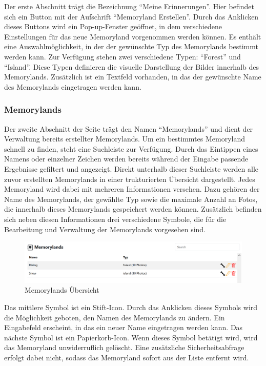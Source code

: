 Der erste Abschnitt trägt die Bezeichnung ``Meine Erinnerungen''. Hier befindet sich ein Button mit der Aufschrift ``Memoryland Erstellen''. Durch das Anklicken dieses Buttons wird ein Pop-up-Fenster geöffnet, in dem verschiedene Einstellungen für das neue Memoryland vorgenommen werden können. Es enthält eine Auswahlmöglichkeit, in der der gewünschte Typ des Memorylands bestimmt werden kann. Zur Verfügung stehen zwei verschiedene Typen: ``Forest'' und ``Island''. Diese Typen definieren die visuelle Darstellung der Bilder innerhalb des Memorylands. Zusätzlich ist ein Textfeld vorhanden, in das der gewünschte Name des Memorylands eingetragen werden kann.



\subsubsection{Memorylands}

Der zweite Abschnitt der Seite trägt den Namen ``Memorylands'' und dient der Verwaltung bereits erstellter Memorylands. Um ein bestimmtes Memoryland schnell zu finden, steht eine Suchleiste zur Verfügung. Durch das Eintippen eines Namens oder einzelner Zeichen werden bereits während der Eingabe passende Ergebnisse gefiltert und angezeigt. Direkt unterhalb dieser Suchleiste werden alle zuvor erstellten Memorylands in einer trukturierten Übersicht dargestellt. Jedes Memoryland wird dabei mit mehreren Informationen versehen. Dazu gehören der Name des Memorylands, der gewählte Typ sowie die maximale Anzahl an Fotos, die innerhalb dieses Memorylands gespeichert werden können. Zusätzlich befinden sich neben diesen Informationen drei verschiedene Symbole, die für die Bearbeitung und Verwaltung der Memorylands vorgesehen sind.

\begin{figure} [h t]
    \centering
    \includegraphics[scale=0.6]{pics/all_worlds_teil2.PNG}
    \caption{Memorylands Übersicht}
    \label{fig:all-worlds-memorylands}
\end{figure}

Das mittlere Symbol ist ein Stift-Icon. Durch das Anklicken dieses Symbols wird die Möglichkeit geboten, den Namen des Memorylands zu ändern. Ein Eingabefeld erscheint, in das ein neuer Name eingetragen werden kann. Das nächste Symbol ist ein Papierkorb-Icon. Wenn dieses Symbol betätigt wird, wird das Memoryland unwiderruflich gelöscht. Eine zusätzliche Sicherheitsabfrage erfolgt dabei nicht, sodass das Memoryland sofort aus der Liste entfernt wird. 

